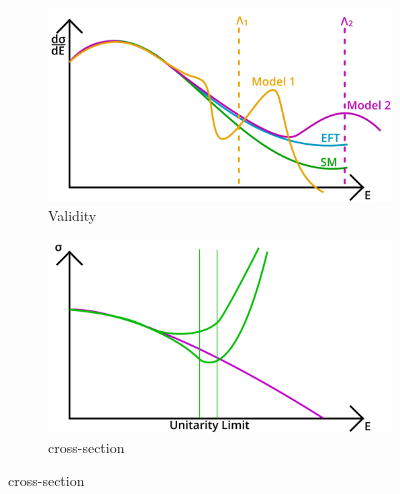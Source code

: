 \documentclass[../Bachelorarbeit.tex]{subfiles}
\begin{document}
\begin{figure}[h]
    \centering
    \begin{subfigure}{0.45\textwidth}
        \centering
        \includegraphics[width=\textwidth]{images/EFT_validity.png}
        \caption{Validity}
        \label{fig:EFT_validity}
    \end{subfigure}
    \begin{subfigure}{0.45\textwidth}
        \centering
        \includegraphics[width=\textwidth]{images/EFT_cross_section.png}
        \caption{cross-section}

    \end{subfigure}
\end{figure}
\end{document}
